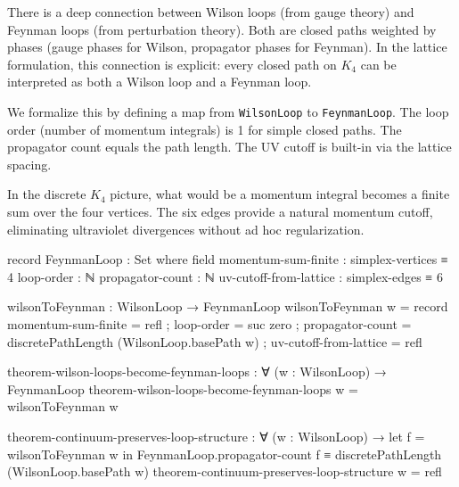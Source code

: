 \documentclass[11pt,a4paper]{book}
\begin{document}
There is a deep connection between Wilson loops (from gauge theory) and Feynman loops (from 
perturbation theory). Both are closed paths weighted by phases (gauge phases for Wilson, 
propagator phases for Feynman). In the lattice formulation, this connection is explicit: 
every closed path on $K_4$ can be interpreted as both a Wilson loop and a Feynman loop.

We formalize this by defining a map from \texttt{WilsonLoop} to \texttt{FeynmanLoop}. The 
loop order (number of momentum integrals) is 1 for simple closed paths. The propagator count 
equals the path length. The UV cutoff is built-in via the lattice spacing.

In the discrete $K_4$ picture, what would be a momentum integral becomes a finite sum over the four vertices. The six edges provide a natural momentum cutoff, eliminating ultraviolet divergences without ad hoc regularization.

\begin{code}
record FeynmanLoop : Set where
  field
    momentum-sum-finite    : simplex-vertices ≡ 4
    loop-order             : ℕ
    propagator-count       : ℕ
    uv-cutoff-from-lattice : simplex-edges ≡ 6

wilsonToFeynman : WilsonLoop → FeynmanLoop
wilsonToFeynman w = record
  { momentum-sum-finite    = refl
  ; loop-order             = suc zero
  ; propagator-count       = discretePathLength (WilsonLoop.basePath w)
  ; uv-cutoff-from-lattice = refl
  }

theorem-wilson-loops-become-feynman-loops : ∀ (w : WilsonLoop) →
  FeynmanLoop
theorem-wilson-loops-become-feynman-loops w = wilsonToFeynman w

theorem-continuum-preserves-loop-structure : 
  ∀ (w : WilsonLoop) → 
  let f = wilsonToFeynman w in
  FeynmanLoop.propagator-count f ≡ discretePathLength (WilsonLoop.basePath w)
theorem-continuum-preserves-loop-structure w = refl
\end{code}
\end{document}
